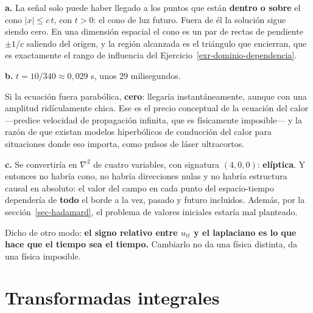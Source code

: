 \documentclass[
  spanish,
  a4paper,
]{scrbook}
\theoremstyle{definition}
\theoremstyle{plain}
\theoremstyle{definition}
\theoremstyle{plain}
\theoremstyle{definition}
\theoremstyle{remark}
\begin{document}
\begin{tcolorbox}[enhanced jigsaw, arc=.35mm, bottomrule=.15mm, bottomtitle=1mm, breakable, colback=white, colbacktitle=quarto-callout-tip-color!10!white, colframe=quarto-callout-tip-color-frame, coltitle=black, left=2mm, leftrule=.75mm, opacityback=0, opacitybacktitle=0.6, rightrule=.15mm, title=\textcolor{quarto-callout-tip-color}{\faLightbulb}\hspace{0.5em}{Solución}, titlerule=0mm, toprule=.15mm, toptitle=1mm]

\textbf{a.} La señal solo puede haber llegado a los puntos que están
\textbf{dentro o sobre} el cono \(|x| \le c\,t\), con \(t>0\): el cono
de luz futuro. Fuera de él la solución sigue siendo cero. En una
dimensión espacial el cono es un par de rectas de pendiente \(\pm 1/c\)
saliendo del origen, y la región alcanzada es el triángulo que
encierran, que es exactamente el rango de influencia del
Ejercicio~\ref{exr-dominio-dependencia}.

\textbf{b.} \(t = 10/340 \approx 0{,}029\) s, unos \(29\) milisegundos.

Si la ecuación fuera parabólica, \textbf{cero}: llegaría
instantáneamente, aunque con una amplitud ridículamente chica. Ese es el
precio conceptual de la ecuación del calor ---predice velocidad de
propagación infinita, que es físicamente imposible--- y la razón de que
existan modelos hiperbólicos de conducción del calor para situaciones
donde eso importa, como pulsos de láser ultracortos.

\textbf{c.} Se convertiría en \(\nabla^2\) de cuatro variables, con
signatura \((4,0,0)\): \textbf{elíptica}. Y entonces no habría cono, no
habría direcciones nulas y no habría estructura causal en absoluto: el
valor del campo en cada punto del espacio-tiempo dependería de
\textbf{todo} el borde a la vez, pasado y futuro incluidos. Además, por
la sección~\ref{sec-hadamard}, el problema de valores iniciales estaría
mal planteado.

Dicho de otro modo: \textbf{el signo relativo entre \(u_{tt}\) y el
laplaciano es lo que hace que el tiempo sea el tiempo.} Cambiarlo no da
una física distinta, da una física imposible.

\end{tcolorbox}

\section{Transformadas integrales}\label{sec-transformadas}
\end{document}
